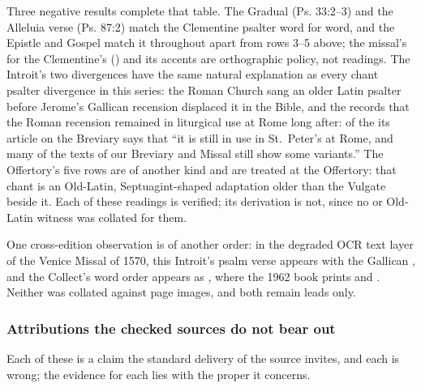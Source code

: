 Three negative results complete that table. The Gradual (Ps. 33:2--3) and
the Alleluia verse (Ps. 87:2) match the Clementine psalter word for word, and
the Epistle and Gospel match it throughout apart from rows 3--5 above; the
missal's  for the Clementine's  () and its accents are orthographic policy, not readings. The
Introit's two divergences have the same natural explanation as every chant
psalter divergence in this series: the Roman Church sang an older Latin
psalter before Jerome's Gallican recension displaced it in the Bible, and the
 records that the Roman recension remained in
liturgical use at Rome long after: of the  its
article on the Breviary says that ``it is still in use in St.\ Peter's at
Rome, and many of the texts of our Breviary and Missal still show some
variants.'' The Offertory's five rows are of another
kind and are treated at the Offertory: that chant is an Old-Latin,
Septuagint-shaped adaptation older than the Vulgate beside it. Each of these
readings is verified; its derivation is not, since no  or Old-Latin witness was collated for them.

One cross-edition observation is of another order: in the degraded OCR text
layer of the Venice Missal of 1570, this Introit's psalm verse appears with the
Gallican , and the Collect's word order appears as
, where the 1962 book prints  and . Neither was collated against
page images, and both remain leads only.

\subsubsection*{Attributions the checked sources do not bear out}

Each of these is a claim the standard delivery of the source invites, and each
is wrong; the evidence for each lies with the proper it concerns.

